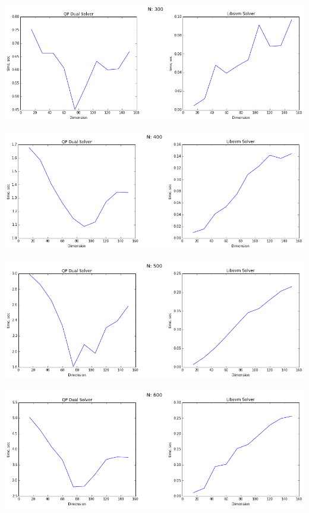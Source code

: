 \documentclass[12pt, a4paper]{article}
\begin{document}
			\begin{center}
				\includegraphics[width=18cm]{2par_N300.png}
			\end{center}

			\begin{center}
				\includegraphics[width=18cm]{2par_N400.png}
			\end{center}

			\begin{center}
				\includegraphics[width=18cm]{2par_N500.png}
			\end{center}

			\begin{center}
				\includegraphics[width=18cm]{2par_N600.png}
			\end{center}
\end{document}
